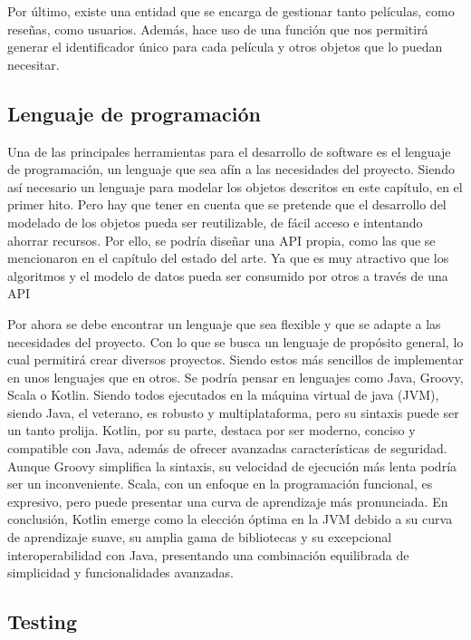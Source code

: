 Por último, existe una entidad que se encarga de gestionar tanto películas, como reseñas, como 
usuarios. Además, hace uso de una función que nos permitirá generar el identificador único para cada 
película y otros objetos que lo puedan necesitar.

\subsection{Lenguaje de programación}

Una de las principales herramientas para el desarrollo de software es el lenguaje de programación, un 
lenguaje que sea afín a las necesidades del proyecto. Siendo así necesario un lenguaje para modelar 
los objetos descritos en este capítulo, en el primer hito. Pero hay que tener en cuenta que se pretende 
que el desarrollo del modelado de los objetos pueda ser reutilizable, de fácil acceso e intentando 
ahorrar recursos. Por ello, se podría diseñar una API propia, como las que se 
mencionaron en el capítulo del estado del arte. Ya que es muy atractivo que los algoritmos y el modelo 
de datos pueda ser consumido por otros a través de una API

Por ahora se debe encontrar un lenguaje que sea flexible y que se adapte a las necesidades del proyecto. Con 
lo que se busca un lenguaje de propósito general, lo cual permitirá crear diversos proyectos. 
Siendo estos más sencillos de implementar en unos lenguajes que en otros. Se podría pensar en lenguajes 
como Java, Groovy, Scala o Kotlin. Siendo todos ejecutados en la máquina virtual de java (JVM), siendo 
Java, el veterano, es robusto y multiplataforma, pero su sintaxis puede ser un tanto prolija. Kotlin, 
por su parte, destaca por ser moderno, conciso y compatible con Java, además de ofrecer avanzadas 
características de seguridad. Aunque Groovy simplifica la sintaxis, su velocidad de ejecución más lenta 
podría ser un inconveniente. Scala, con un enfoque en la programación funcional, es expresivo, pero 
puede presentar una curva de aprendizaje más pronunciada. En conclusión, Kotlin emerge como la elección 
óptima en la JVM debido a su curva de aprendizaje suave, su amplia gama de bibliotecas y su excepcional 
interoperabilidad con Java, presentando una combinación equilibrada de simplicidad y funcionalidades 
avanzadas. 

\subsection{Testing}

